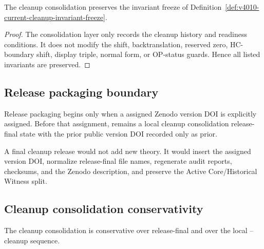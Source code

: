 \begin{proposition}
\label{prop:v4010-cleanup-consolidation-preserves-invariant-freeze}
The  cleanup consolidation preserves the invariant freeze of
Definition~\ref{def:v4010-current-cleanup-invariant-freeze}.
\end{proposition}

\begin{proof}
The consolidation layer only records the cleanup history and readiness
conditions. It does not modify the shift, backtranslation, reserved zero,
HC-boundary shift, display triple, normal form, or OP-status guards. Hence all
listed invariants are preserved.
\end{proof}

\subsection{Release packaging boundary}
\label{subsec:v4010-release-packaging-boundary}

\begin{definition}
\label{def:v4010-release-packaging-boundary}
Release packaging begins only when a assigned Zenodo version DOI is explicitly
assigned. Before that assignment,  remains a local cleanup consolidation
release-final state with the prior public version DOI recorded only as prior.
\end{definition}

\begin{remark}
\label{rem:v4010-final-cleanup-release-would-do}
A final cleanup release would not add new theory. It would insert the
assigned version DOI, normalize release-final file names, regenerate audit reports,
checksums, and the Zenodo description, and preserve the Active Core/Historical
Witness split.
\end{remark}

\subsection{Cleanup consolidation conservativity}
\label{subsec:v4010-cleanup-consolidation-conservativity}

\begin{theorem}
\label{thm:v4010-cleanup-consolidation-conservativity}
The  cleanup consolidation is conservative over  release-final and
over the local -- cleanup sequence.
\end{theorem}

